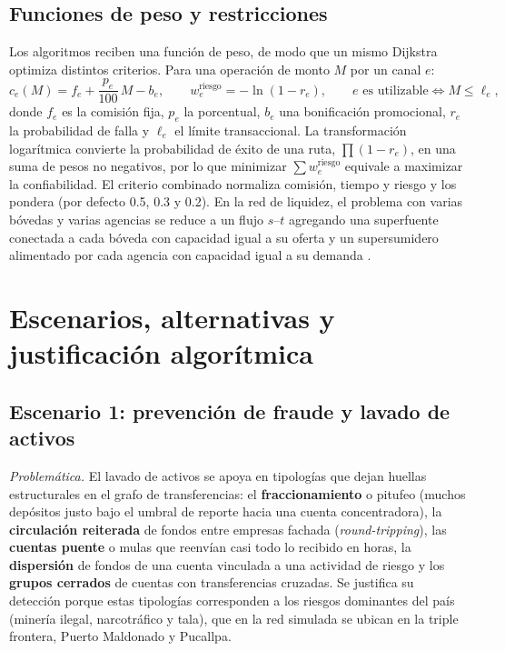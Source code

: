 \documentclass[11pt,a4paper]{article}
\begin{document}
\subsection{Funciones de peso y restricciones}
Los algoritmos reciben una función de peso, de modo que un mismo Dijkstra optimiza distintos criterios. Para una
operación de monto $M$ por un canal $e$:
\begin{equation}
c_e(M) = f_e + \frac{p_e}{100}\,M - b_e, \qquad
w^{\text{riesgo}}_e = -\ln(1-r_e), \qquad e \text{ es utilizable} \iff M \le \ell_e,
\end{equation}
donde $f_e$ es la comisión fija, $p_e$ la porcentual, $b_e$ una bonificación promocional, $r_e$ la probabilidad de
falla y $\ell_e$ el límite transaccional. La transformación logarítmica convierte la probabilidad de éxito de una ruta,
$\prod(1-r_e)$, en una suma de pesos no negativos, por lo que minimizar $\sum w^{\text{riesgo}}_e$ equivale a
maximizar la confiabilidad. El criterio combinado normaliza comisión, tiempo y riesgo y los pondera
(por defecto 0.5, 0.3 y 0.2). En la red de liquidez, el problema con varias bóvedas y varias agencias se reduce a un
flujo $s$–$t$ agregando una superfuente conectada a cada bóveda con capacidad igual a su oferta y un supersumidero
alimentado por cada agencia con capacidad igual a su demanda \citep{ahuja1993}.

\section{Escenarios, alternativas y justificación algorítmica}

\subsection{Escenario 1: prevención de fraude y lavado de activos}
\textit{Problemática.} El lavado de activos se apoya en tipologías que dejan huellas estructurales en el grafo de
transferencias: el \textbf{fraccionamiento} o pitufeo (muchos depósitos justo bajo el umbral de reporte hacia una
cuenta concentradora), la \textbf{circulación reiterada} de fondos entre empresas fachada (\textit{round-tripping}),
las \textbf{cuentas puente} o mulas que reenvían casi todo lo recibido en horas, la \textbf{dispersión} de fondos de
una cuenta vinculada a una actividad de riesgo y los \textbf{grupos cerrados} de cuentas con transferencias cruzadas.
Se justifica su detección porque estas tipologías corresponden a los riesgos dominantes del país (minería ilegal,
narcotráfico y tala), que en la red simulada se ubican en la triple frontera, Puerto Maldonado y Pucallpa.
\end{document}
